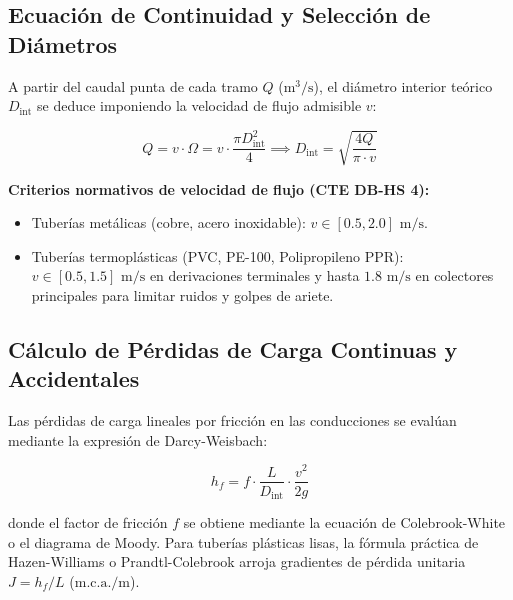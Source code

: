 \documentclass{report}
\begin{document}
\subsection{Ecuación de Continuidad y Selección de Diámetros}

A partir del caudal punta de cada tramo $Q$ ($\text{m}^3/\text{s}$), el diámetro interior teórico $D_{\text{int}}$ se deduce imponiendo la velocidad de flujo admisible $v$:

\begin{equation}

    Q = v \cdot \Omega = v \cdot \frac{\pi D_{\text{int}}^2}{4} \implies D_{\text{int}} = \sqrt{\frac{4 Q}{\pi \cdot v}}

\end{equation}



\textbf{Criterios normativos de velocidad de flujo (CTE DB-HS 4):}

\begin{itemize}

    \item Tuberías metálicas (cobre, acero inoxidable): $v \in [0.5, 2.0]\text{ m/s}$.

    \item Tuberías termoplásticas (PVC, PE-100, Polipropileno PPR): $v \in [0.5, 1.5]\text{ m/s}$ en derivaciones terminales y hasta $1.8\text{ m/s}$ en colectores principales para limitar ruidos y golpes de ariete.

\end{itemize}



\subsection{Cálculo de Pérdidas de Carga Continuas y Accidentales}

Las pérdidas de carga lineales por fricción en las conducciones se evalúan mediante la expresión de Darcy-Weisbach:

\begin{equation}

    h_f = f \cdot \frac{L}{D_{\text{int}}} \cdot \frac{v^2}{2g}

\end{equation}

donde el factor de fricción $f$ se obtiene mediante la ecuación de Colebrook-White o el diagrama de Moody. Para tuberías plásticas lisas, la fórmula práctica de Hazen-Williams o Prandtl-Colebrook arroja gradientes de pérdida unitaria $J = h_f / L$ ($\text{m.c.a./m}$).
\end{document}
